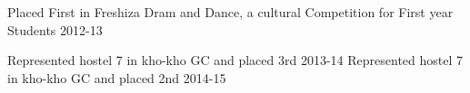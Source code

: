 \begin{cvhonors}
  \cvhonor
    {}
    {\hspace{-1.5mm}Placed First in Freshiza Dram and Dance, a cultural Competition for First year Students}
    {}
    {2012-13}
   
  \cvhonor
    {}
    {\hspace{-1.5mm}Represented hostel 7 in kho-kho GC and placed 3rd }
    {}
    {2013-14}
    \cvhonor
    {}
    {\hspace{-1.5mm}Represented hostel 7 in kho-kho GC and placed 2nd }
    {}
    {2014-15}
   
\end{cvhonors}
